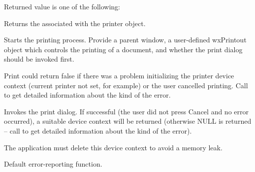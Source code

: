 Returned value is one of the following:

\twocolwidtha{7cm}
\begin{twocollist}\itemsep=0pt
\end{twocollist}


\label{wxprintergetprintdialogdata}


Returns the  associated with the printer object.

\label{wxprinterprint}


Starts the printing process. Provide a parent window, a user-defined wxPrintout object which controls
the printing of a document, and whether the print dialog should be invoked first.

Print could return false if there was a problem initializing the printer device context
(current printer not set, for example) or the user cancelled printing. Call
 to get detailed
information about the kind of the error.

\label{wxprinterprintdialog}


Invokes the print dialog. If successful (the user did not press Cancel
and no error occurred), a suitable device context will be returned
(otherwise NULL is returned -- call
 to get detailed
information about the kind of the error).

The application must delete this device context to avoid a memory leak.

\label{wxprinterreporterror}


Default error-reporting function.

\label{wxprintersetup}

